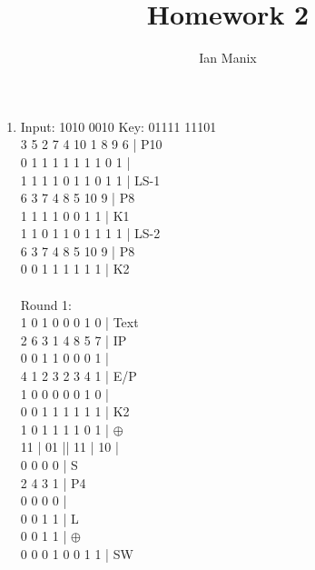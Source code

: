 \documentclass[sigconf]{article}
\title{
  \textbf{Homework 2} \\
  }
\author{ 
  Ian Manix
  }
\begin{document}



\maketitle




\section*{}
\begin{enumerate}
  \item Input: 1010 0010  Key: 01111 11101 \\
        3 5 2 7 4 10 1 8 9 6 | P10\\
        0 1 1 1 1 1 1 1 0 1 | \\
        1 1 1 1 0 1 1 0 1 1 | LS-1\\
        6 3 7 4 8 5 10 9 | P8\\
        1 1 1 1 0 0 1 1 | K1\\
        1 1 0 1 1 0 1 1 1 1 | LS-2\\
        6 3 7 4 8 5 10 9 | P8\\
        0 0 1 1 1 1 1 1 | K2\\
        \\
        Round 1:\\
        1 0 1 0 0 0 1 0 | Text\\
        2 6 3 1 4 8 5 7 | IP\\
        0 0 1 1 0 0 0 1 |\\
        4 1 2 3 2 3 4 1 | E/P\\
        1 0 0 0 0 0 1 0 |\\
        0 0 1 1 1 1 1 1 | K2\\
        1 0 1 1 1 1 0 1 | $\oplus$\\
        11 | 01 || 11 | 10 |\\
        0 0 0 0 | S\\
        2 4 3 1 | P4\\
        0 0 0 0 |\\
        0 0 1 1 | L\\
        0 0 1 1 | $\oplus$\\
        0 0 0 1 0 0 1 1 | SW\\ %

\end{enumerate}
\end{document}
